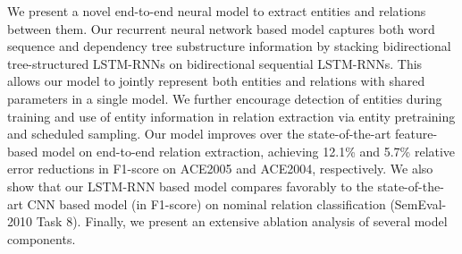 We present a novel end-to-end neural model to extract entities and relations between them. Our recurrent neural network based model captures both word sequence and dependency tree substructure information by stacking bidirectional tree-structured LSTM-RNNs on bidirectional sequential LSTM-RNNs. This allows our model to jointly represent both entities and relations with shared parameters in a single model. We further encourage detection of entities during training and use of entity information in relation extraction via entity pretraining and scheduled sampling. Our model improves over the state-of-the-art feature-based model on end-to-end relation extraction, achieving 12.1\% and 5.7\% relative error reductions in F1-score on ACE2005 and ACE2004, respectively. We also show that our LSTM-RNN based model compares favorably to the state-of-the-art CNN based model (in F1-score) on nominal relation classification (SemEval-2010 Task 8). Finally, we present an extensive ablation analysis of several model components.
